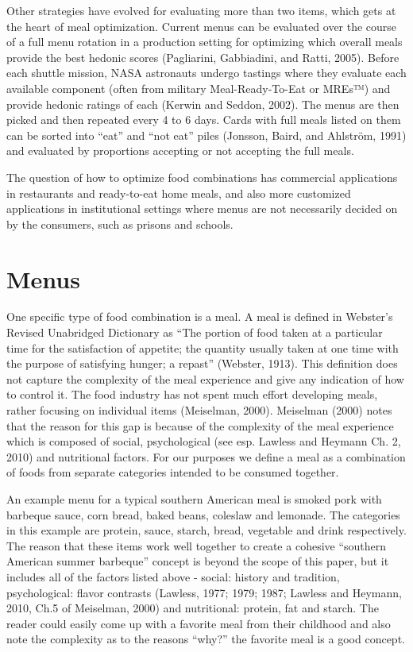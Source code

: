 Other strategies have evolved for evaluating more than two items, which gets at the heart of meal optimization.  Current menus can be evaluated over the course of a full menu rotation in a production setting for optimizing which overall meals provide the best hedonic scores (Pagliarini, Gabbiadini, and Ratti, 2005). Before each shuttle mission, NASA astronauts undergo tastings where they evaluate each available component (often from military Meal-Ready-To-Eat or MREs™) and provide hedonic ratings of each (Kerwin and Seddon, 2002).  The menus are then picked and then repeated every 4 to 6 days.  Cards with full meals listed on them can be sorted into “eat” and “not eat” piles (Jonsson, Baird, and Ahlström, 1991) and evaluated by proportions accepting or not accepting the full meals.

The question of how to optimize food combinations has commercial applications in restaurants and ready-to-eat home meals, and also more customized applications in institutional settings where menus are not necessarily decided on by the consumers, such as prisons and schools.

\section{Menus}
One specific type of food combination is a meal.  A meal is defined in Webster’s Revised Unabridged Dictionary as “The portion of food taken at a particular time for the satisfaction of appetite; the quantity usually taken at one time with the purpose of satisfying hunger; a repast” (Webster, 1913).  This definition does not capture the complexity of the meal experience and give any indication of how to control it.  The food industry has not spent much effort developing meals, rather focusing on individual items (Meiselman, 2000).  Meiselman (2000) notes that the reason for this gap is because of the complexity of the meal experience which is composed of social, psychological (see esp. Lawless and Heymann Ch. 2, 2010)  and nutritional factors.  For our purposes we define a meal as a combination of foods from separate categories intended to be consumed together. 
 
An example menu for a typical southern American meal is smoked pork with barbeque sauce, corn bread, baked beans, coleslaw and lemonade.  The categories in this example are protein, sauce, starch, bread, vegetable and drink respectively.  The reason that these items work well together to create a cohesive “southern American summer barbeque” concept is beyond the scope of this paper, but it includes all of the factors listed above - social: history and tradition, psychological: flavor contrasts (Lawless, 1977; 1979; 1987; Lawless and Heymann, 2010, Ch.5 of Meiselman, 2000) and nutritional: protein, fat and starch.  The reader could easily come up with a favorite meal from their childhood and also note the complexity as to the reasons “why?” the favorite meal is a good concept.  
 

